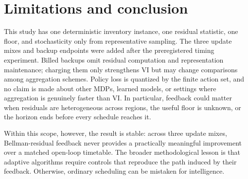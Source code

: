 \documentclass{article}
\newcommand{\VI}{\textsc{VI}}
\begin{document}
\section{Limitations and conclusion}

This study has one deterministic inventory instance, one residual statistic,
one floor, and stochasticity only from representative sampling.  The three
update mixes and backup endpoints were added after the preregistered timing
experiment.  Billed backups omit residual computation and representation
maintenance; charging them only strengthens \VI{} but may change comparisons
among aggregation schemes.  Policy loss is quantized by the finite action set,
and no claim is made about other MDPs, learned models, or settings where
aggregation is genuinely faster than \VI{}.  In particular, feedback could
matter when residuals are heterogeneous across regions, the useful floor is
unknown, or the horizon ends before every schedule reaches it.

Within this scope, however, the result is stable: across three update mixes,
Bellman-residual feedback never provides a practically meaningful improvement
over a matched open-loop timetable.  The broader methodological lesson is that
adaptive algorithms require controls that reproduce the path induced by their
feedback.  Otherwise, ordinary scheduling can be mistaken for intelligence.
\end{document}
